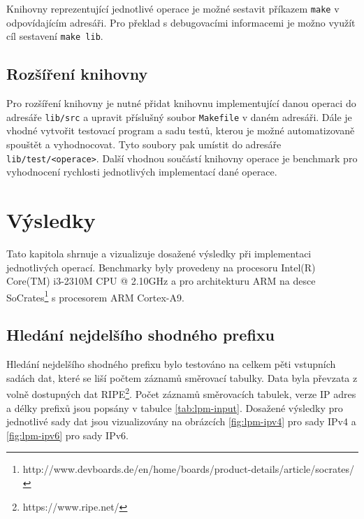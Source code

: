 Knihovny reprezentující jednotlivé operace je možné sestavit příkazem \texttt{make}
v odpovídajícím adresáři. Pro překlad s debugovacími informacemi je možno využít cíl sestavení
\texttt{make lib}.

\section{Rozšíření knihovny}\label{api:extension} %

Pro rozšíření knihovny je nutné přidat knihovnu implementující danou operaci
do adresáře \texttt{lib/src} a upravit příslušný soubor \texttt{Makefile} v daném adresáři.
Dále je vhodné vytvořit testovací program a sadu testů, kterou je možné automatizovaně spouštět a vyhodnocovat.
Tyto soubory pak umístit do adresáře \texttt{lib/test/<operace>}.
Další vhodnou součástí knihovny operace je benchmark pro vyhodnocení rychlosti jednotlivých
implementací dané operace.



\chapter{Výsledky}\label{chapter:results} %
Tato kapitola shrnuje a vizualizuje dosažené výsledky při implementaci jednotlivých operací.
Benchmarky byly provedeny na procesoru Intel(R) Core(TM) i3-2310M CPU @ 2.10GHz a pro architekturu ARM na desce SoCrates\footnote{http://www.devboards.de/en/home/boards/product-details/article/socrates/} s procesorem ARM Cortex-A9.

\section{Hledání nejdelšího shodného prefixu}\label{section:results-lpm} %

Hledání nejdelšího shodného prefixu bylo testováno na celkem pěti vstupních sadách dat, které
se liší počtem záznamů směrovací tabulky. Data byla převzata z volně dostupných dat RIPE\footnote{https://www.ripe.net/}.
Počet záznamů směrovacích tabulek, verze IP adres a délky prefixů jsou popsány v tabulce \ref{tab:lpm-input}.
Dosažené výsledky pro jednotlivé sady dat jsou vizualizovány na obrázcích \ref{fig:lpm-ipv4} pro sady IPv4 a
\ref{fig:lpm-ipv6} pro sady IPv6.

